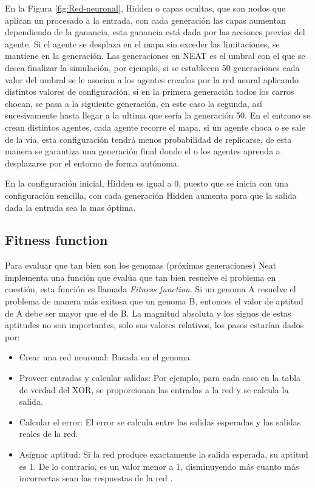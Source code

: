 \documentclass[conference]{IEEEtran}
\begin{document}
En la Figura \ref{fig:Red-neuronal},  Hidden o capas ocultas, que son nodos que aplican un procesado a la entrada, con cada generación las capas aumentan dependiendo de la ganancia, esta ganancia está dada por las acciones previas del agente. Si el agente se desplaza en el mapa sin exceder las limitaciones, se mantiene en la generación. Las generaciones en NEAT es el umbral con el que se desea finalizar la simulación, por ejemplo, si se establecen 50 generaciones cada valor del umbral se le asocian a los agentes creados por la red neural aplicando distintos valores de configuración, si en la primera generación todos los carros chocan, se pasa a la siguiente generación, en este caso la segunda, así sucesivamente hasta llegar a la ultima que sería la generación 50. En el entrono se crean distintos agentes, cada agente recorre el mapa, si un agente choca o se sale de la vía, esta configuración tendrá menos probabilidad de replicarse, de esta manera se garantiza una generación final donde el o los agentes aprenda a desplazarse por el entorno de forma autónoma.

En la configuración inicial, Hidden es igual a 0, puesto que se inicia con una configuración sencilla, con cada generación Hidden aumenta para que la salida dada la entrada sea la mas óptima.

\subsection{Fitness function}
Para evaluar que tan bien son los genomas (próximas generaciones) Neat implementa una función que evalúa que tan bien resuelve el problema en cuestión, esta función es llamada \textit{Fitness function}. Si un genoma A resuelve el problema de manera más exitosa que un genoma B, entonces el valor de aptitud de A debe ser mayor que el de B. La magnitud absoluta y los signos de estas aptitudes no son importantes, solo sus valores relativos, los pasos estarían dados por:
\begin{itemize}
    \item Crear una red neuronal: Basada en el genoma.
    \item Proveer entradas y calcular salidas: Por ejemplo, para cada caso en la tabla de verdad del XOR, se proporcionan las entradas a la red y se calcula la salida.
    \item Calcular el error: El error se calcula entre las salidas esperadas y las salidas reales de la red.
    \item Asignar aptitud: Si la red produce exactamente la salida esperada, su aptitud es 1. De lo contrario, es un valor menor a 1, disminuyendo más cuanto más incorrectas sean las respuestas de la red \cite{neat_python}.
\end{itemize}
\end{document}
